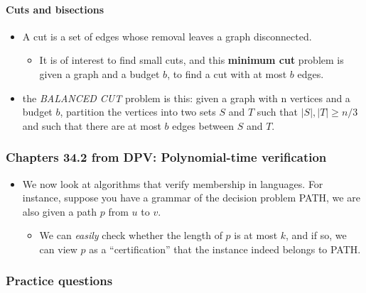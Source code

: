 \documentclass[a4paper,11pt]{article}
\begin{document}
\paragraph{Cuts and bisections}\label{cuts-and-bisections}

\begin{itemize}
\itemsep1pt\parskip0pt
\item
  A cut is a set of edges whose removal leaves a graph disconnected.

  \begin{itemize}
  \itemsep1pt\parskip0pt
  \item
    It is of interest to find small cuts, and this \textbf{minimum cut}
    problem is given a graph and a budget $b$, to find a cut with at
    most $b$ edges.
  \end{itemize}
\item
  the \emph{BALANCED CUT} problem is this: given a graph with n vertices
  and a budget $b$, partition the vertices into two sets $S$ and $T$
  such that $|S|,|T| \ge n/3$ and such that there are at most $b$ edges
  between $S$ and $T$.
\end{itemize}

\subsubsection{Chapters 34.2 from DPV: Polynomial-time
verification}\label{chapters-34.2-from-dpv-polynomial-time-verification}

\begin{itemize}
\itemsep1pt\parskip0pt
\item
  We now look at algorithms that verify membership in languages. For
  instance, suppose you have a grammar of the decision problem PATH, we
  are also given a path $p$ from $u$ to $v$.

  \begin{itemize}
  \itemsep1pt\parskip0pt
  \item
    We can \emph{easily} check whether the length of $p$ is at most $k$,
    and if so, we can view $p$ as a ``certification'' that the instance
    indeed belongs to PATH.
  \end{itemize}
\end{itemize}

\subsubsection{Practice questions}\label{practice-questions-19}
\end{document}
